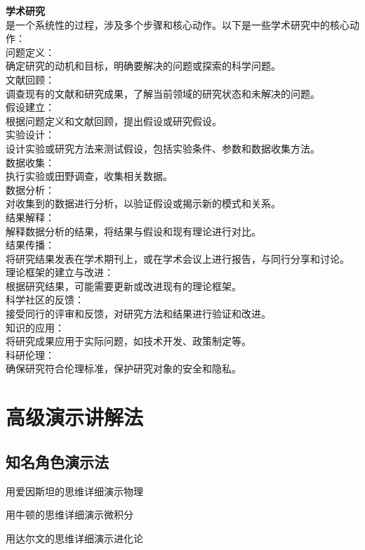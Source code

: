 \documentclass[12pt]{book}
\begin{document}
\textbf{学术研究}\\
是一个系统性的过程，涉及多个步骤和核心动作。以下是一些学术研究中的核心动作：\\
问题定义：\\
确定研究的动机和目标，明确要解决的问题或探索的科学问题。\\
文献回顾：\\
调查现有的文献和研究成果，了解当前领域的研究状态和未解决的问题。\\
假设建立：\\
根据问题定义和文献回顾，提出假设或研究假设。\\
实验设计：\\
设计实验或研究方法来测试假设，包括实验条件、参数和数据收集方法。\\
数据收集：\\
执行实验或田野调查，收集相关数据。\\
数据分析：\\
对收集到的数据进行分析，以验证假设或揭示新的模式和关系。\\
结果解释：\\
解释数据分析的结果，将结果与假设和现有理论进行对比。\\
结果传播：\\
将研究结果发表在学术期刊上，或在学术会议上进行报告，与同行分享和讨论。\\
理论框架的建立与改进：\\
根据研究结果，可能需要更新或改进现有的理论框架。\\
科学社区的反馈：\\
接受同行的评审和反馈，对研究方法和结果进行验证和改进。\\
知识的应用：\\
将研究成果应用于实际问题，如技术开发、政策制定等。\\
科研伦理：\\
确保研究符合伦理标准，保护研究对象的安全和隐私。\\

\section{高级演示讲解法}
\subsection{知名角色演示法}

用爱因斯坦的思维详细演示物理


用牛顿的思维详细演示微积分


用达尔文的思维详细演示进化论
\end{document}

